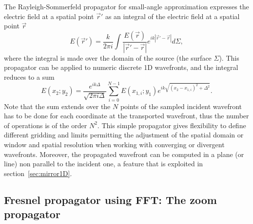\documentclass{iopconfser}
\begin{document}
The Rayleigh-Sommerfeld propagator for small-angle approximation expresses the electric field at a spatial point $\vec{r}'$ as an integral of the electric field at a spatial point $\vec{r}$ \citep{goodmanfourier}
\begin{equation}\label{eq:RSpropagator}
E(\vec{r}') =  \frac{k}{2 \pi i} \int \frac{E(\vec{r})}{|\vec{r}'-\vec{r}|} e^{ i k |\vec{r}' - \vec{r}|  }  d\Sigma,
\end{equation}
where the integral is made over the domain of the source (the surface $\Sigma$). 
This propagator can be applied to numeric discrete 1D wavefronts, and the integral reduces to a sum
\begin{equation}\label{eq:discreteRSpropagator}
E(x_2;y_2) = \frac{e^{i k \Delta}}{\sqrt{2 \pi i \Delta}}  \sum_{i=0}^{N-1}  E(x_{1,i};y_1) e^{i k \sqrt{(x_2 - x_{1,i})^2 + \Delta^2} }.
\end{equation}
Note that the sum extends over the $N$ points of the sampled incident wavefront has to be done for each coordinate at the transported wavefront, thus the number of operations is of the order $N^2$. This simple propagator gives flexibility to define different gridding and limits permitting the adjustment of the spatial domain or window and spatial resolution when working with converging or divergent wavefronts. Moreover, the propagated wavefront can be computed in a plane (or line) non parallel to the incident one, a feature that is exploited in section~\ref{sec:mirror1D}.


\subsection{Fresnel propagator using FFT: The zoom propagator}
\label{sec:zoomPropagator}
\end{document}

